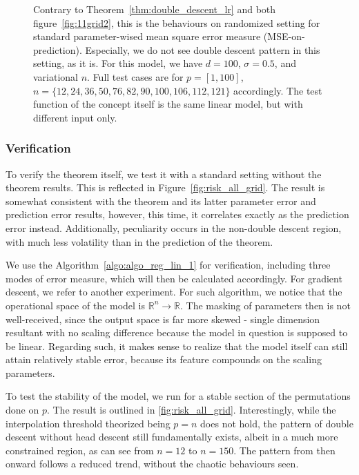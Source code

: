 \documentclass{article}
\begin{document}
\begin{figure}[htb]
  \caption{Contrary to Theorem~\ref{thm:double_descent_lr} and both figure~\ref{fig:11grid2}, this is the behaviours on randomized setting for standard parameter-wised mean square error measure (MSE-on-prediction). Especially, we do not see double descent pattern in this setting, as it is. For this model, we have $d=100$, $\sigma = 0.5$, and variational $n$. Full test cases are for $p=[1,100]$, $n=\{12,24,36,50,76,82,90,100,106,112,121\}$ accordingly. The test function of the concept itself is the same linear model, but with different input only.}
  \label{fig:11grid21}
\end{figure}

\clearpage 

\subsubsection{Verification}

To verify the theorem itself, we test it with a standard setting without the theorem results. This is reflected in Figure~\ref{fig:risk_all_grid}. The result is somewhat consistent with the theorem and its latter parameter error and prediction error results, however, this time, it correlates exactly as the prediction error instead. Additionally, peculiarity occurs in the non-double descent region, with much less volatility than in the prediction of the theorem. 

We use the Algorithm~\ref{algo:algo_reg_lin_1} for verification, including three modes of error measure, which will then be calculated accordingly. For gradient descent, we refer to another experiment. For such algorithm, we notice that the operational space of the model is $\mathbb{R}^{n}\to \mathbb{R}$. The masking of parameters then is not well-received, since the output space is far more skewed - single dimension resultant with no scaling difference because the model in question is supposed to be linear. Regarding such, it makes sense to realize that the model itself can still attain relatively stable error, because its feature compounds on the scaling parameters.  

To test the stability of the model, we run for a stable section of the permutations done on $p$. The result is outlined in \ref{fig:risk_all_grid}. Interestingly, while the interpolation threshold theorized being $p=n$ does not hold, the pattern of double descent without head descent still fundamentally exists, albeit in a much more constrained region, as can see from $n=12$ to $n=150$. The pattern from then onward follows a reduced trend, without the chaotic behaviours seen. 
\end{document}
